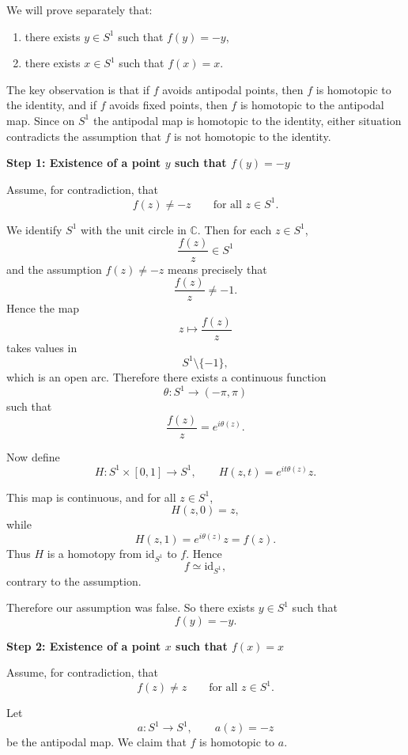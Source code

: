 \begin{solution}
We will prove separately that:

\begin{enumerate}
	\item there exists \(y\in S^1\) such that \(f(y)=-y\),
	\item there exists \(x\in S^1\) such that \(f(x)=x\).
\end{enumerate}

The key observation is that if \(f\) avoids antipodal points, then \(f\) is homotopic to the identity, and if \(f\) avoids fixed points, then \(f\) is homotopic to the antipodal map. Since on \(S^1\) the antipodal map is homotopic to the identity, either situation contradicts the assumption that \(f\) is not homotopic to the identity.


\medskip
\noindent\textbf{Step 1: Existence of a point \(y\) such that \(f(y)=-y\)}\par
\smallskip


Assume, for contradiction, that
\[
f(z)\neq -z
\qquad\text{for all }z\in S^1.
\]

We identify \(S^1\) with the unit circle in \(\mathbb C\). Then for each \(z\in S^1\),
\[
\frac{f(z)}{z}\in S^1
\]
and the assumption \(f(z)\neq -z\) means precisely that
\[
\frac{f(z)}{z}\neq -1.
\]
Hence the map
\[
z\longmapsto \frac{f(z)}{z}
\]
takes values in
\[
S^1\setminus\{-1\},
\]
which is an open arc. Therefore there exists a continuous function
\[
\theta:S^1\to (-\pi,\pi)
\]
such that
\[
\frac{f(z)}{z}=e^{i\theta(z)}.
\]

Now define
\[
H:S^1\times[0,1]\to S^1,
\qquad
H(z,t)=e^{it\theta(z)}z.
\]

This map is continuous, and for all \(z\in S^1\),
\[
H(z,0)=z,
\]
while
\[
H(z,1)=e^{i\theta(z)}z=f(z).
\]
Thus \(H\) is a homotopy from \(\mathrm{id}_{S^1}\) to \(f\). Hence
\[
f\simeq \mathrm{id}_{S^1},
\]
contrary to the assumption.

Therefore our assumption was false. So there exists \(y\in S^1\) such that
\[
f(y)=-y.
\]


\medskip
\noindent\textbf{Step 2: Existence of a point \(x\) such that \(f(x)=x\)}\par
\smallskip


Assume, for contradiction, that
\[
f(z)\neq z
\qquad\text{for all }z\in S^1.
\]

Let
\[
a:S^1\to S^1,\qquad a(z)=-z
\]
be the antipodal map. We claim that \(f\) is homotopic to \(a\).


\end{solution}
